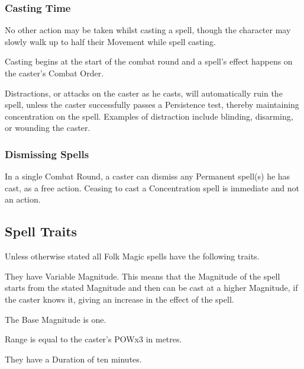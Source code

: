\subsubsection{Casting Time}
No other action may be taken whilst casting a spell, though the character may slowly walk up to half their Movement while spell casting. %

Casting begins at the start of the combat round and a spell’s effect happens on the caster’s Combat Order.%

Distractions, or attacks on the caster as he casts, will automatically ruin the spell, unless the caster successfully passes a Persistence test, thereby maintaining concentration on the spell. Examples of distraction include blinding, disarming, or wounding the caster.

\subsubsection{Dismissing Spells}
In a single Combat Round, a caster can dismiss any Permanent spell(s) he has cast, as a free action. Ceasing to cast a Concentration spell is immediate and not an action. 


\subsection{Spell Traits}
Unless otherwise stated all Folk Magic spells have the following traits.

\begin{rpg-list}
\item They have Variable Magnitude. This means that the Magnitude of the spell starts from the stated Magnitude and then can be cast at a higher Magnitude, if the caster knows it, giving an increase in the effect of the spell. %
\item The Base Magnitude is one. 
\item Range is equal to the caster’s POWx3 in metres.
\item They have a Duration of ten minutes.
\end{rpg-list}

